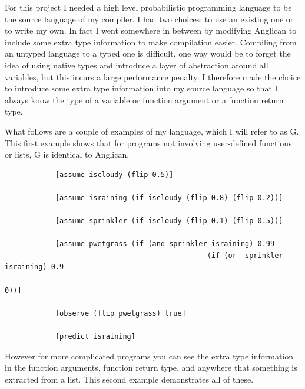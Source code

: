 \documentclass[a4paper]{article}
\begin{document}
For this project I needed a high level probabilistic programming language to be the source language of my compiler. I had two choices: to use an existing one or to write my own. In fact I went somewhere in between by modifying Anglican to include some extra type information to make compilation easier. Compiling from an untyped language to a typed one is difficult, one way would be to forget the idea of using native types and introduce a layer of abstraction around all variables, but this incurs a large performance penalty. I therefore made the choice to introduce some extra type information into my source language so that I always know the type of a variable or function argument or a function return type.

What follows are a couple of examples of my language, which I will refer to as G. This first example shows that for programs not involving user-defined functions or lists, G is identical to Anglican.
\begin{center}
	\begin{varwidth}{\linewidth}
		\small
		\begin{verbatim}
			[assume iscloudy (flip 0.5)]
			
			[assume israining (if iscloudy (flip 0.8) (flip 0.2))]
			
			[assume sprinkler (if iscloudy (flip 0.1) (flip 0.5))]
			
			[assume pwetgrass (if (and sprinkler israining) 0.99
												(if (or  sprinkler israining) 0.9
																											0))]
			
			[observe (flip pwetgrass) true]
			
			[predict israining]
		\end{verbatim}
	\end{varwidth}
\end{center}
However for more complicated programs you can see the extra type information in the function arguments, function return type, and anywhere that something is extracted from a list. This second example demonstrates all of these.
\end{document}
